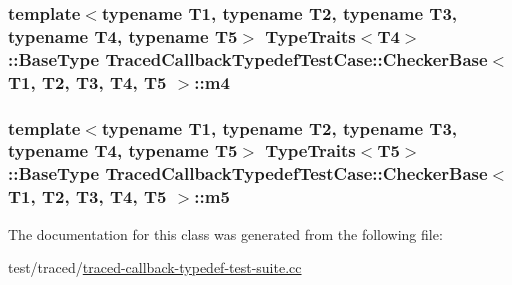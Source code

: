 \subsubsection[{\texorpdfstring{m4}{m4}}]{\setlength{\rightskip}{0pt plus 5cm}template$<$typename T1, typename T2, typename T3, typename T4, typename T5$>$ {\bf Type\+Traits}$<$T4$>$\+::Base\+Type {\bf Traced\+Callback\+Typedef\+Test\+Case\+::\+Checker\+Base}$<$ T1, T2, T3, T4, T5 $>$\+::m4}\hypertarget{classTracedCallbackTypedefTestCase_1_1CheckerBase_ae8e8ea34137d3a8ad4fca2e6a11e6d29}{}\label{classTracedCallbackTypedefTestCase_1_1CheckerBase_ae8e8ea34137d3a8ad4fca2e6a11e6d29}
\subsubsection[{\texorpdfstring{m5}{m5}}]{\setlength{\rightskip}{0pt plus 5cm}template$<$typename T1, typename T2, typename T3, typename T4, typename T5$>$ {\bf Type\+Traits}$<$T5$>$\+::Base\+Type {\bf Traced\+Callback\+Typedef\+Test\+Case\+::\+Checker\+Base}$<$ T1, T2, T3, T4, T5 $>$\+::m5}\hypertarget{classTracedCallbackTypedefTestCase_1_1CheckerBase_a839827d99a0628d5fe37f1d55d711a96}{}\label{classTracedCallbackTypedefTestCase_1_1CheckerBase_a839827d99a0628d5fe37f1d55d711a96}


The documentation for this class was generated from the following file\+:\begin{DoxyCompactItemize}
\item 
test/traced/\hyperlink{traced-callback-typedef-test-suite_8cc}{traced-\/callback-\/typedef-\/test-\/suite.\+cc}\end{DoxyCompactItemize}
